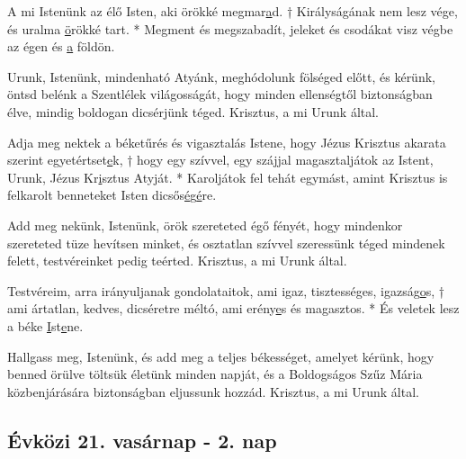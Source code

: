 \documentclass[twoside]{article}
\begin{document}

A mi Istenünk az élő Isten, aki örökké megmar\underline{a}d. † Királyságának nem lesz vége, és uralma \underline{ö}rökké tart. * Megment és megszabadít, jeleket és csodákat visz végbe az égen és \underline{a} földön.


Urunk, Istenünk, mindenható Atyánk, meghódolunk fölséged előtt, és kérünk, öntsd belénk a Szentlélek világosságát, hogy minden ellenségtől biztonságban élve, mindig boldogan dicsérjünk téged. Krisztus, a mi Urunk által.


Adja meg nektek a béketűrés és vigasztalás Istene, hogy Jézus Krisztus akarata szerint egyetértset\underline{e}k, † hogy egy szívvel, egy szájjal magasztaljátok az Istent, Urunk, Jézus Kr\underline{i}sztus Atyját. * Karoljátok fel tehát egymást, amint Krisztus is felkarolt benneteket Isten dicsős\underline{é}g\underline{é}re.


Add meg nekünk, Istenünk, örök szereteted égő fényét, hogy mindenkor szereteted tüze hevítsen minket, és osztatlan szívvel szeressünk téged mindenek felett, testvéreinket pedig teérted. Krisztus, a mi Urunk által.


Testvéreim, arra irányuljanak gondolataitok, ami igaz, tisztességes, igazság\underline{o}s, † ami ártatlan, kedves, dicséretre méltó, ami erény\underline{e}s és magasztos. * És veletek lesz a béke \underline{I}st\underline{e}ne.


Hallgass meg, Istenünk, és add meg a teljes békességet, amelyet kérünk, hogy benned örülve töltsük életünk minden napját, és a Boldogságos Szűz Mária közbenjárására biztonságban eljussunk hozzád. Krisztus, a mi Urunk által.

\subsection*{Évközi 21. vasárnap - 2. nap}
\end{document}
